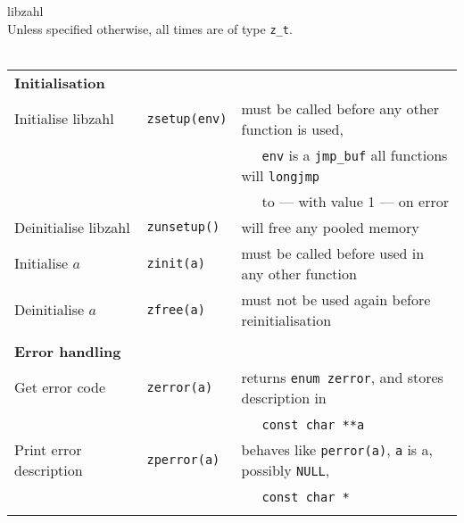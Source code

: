 \documentclass[10pt,draft]{article}
\begin{document}
{\Huge libzahl}
\\

Unless specified otherwise, all times are of type {\tt z\_t}.
\\ \\


\begin{tabular}{lll}
\textbf{Initialisation}       & {}                         & {}                                                \\
Initialise libzahl            & {\tt zsetup(env)}          & must be called before any other function is used, \\
{}                            & {}                         & $~~~~~$ {\tt env} is a {\tt jmp\_buf} all
                                                                     functions will {\tt longjmp}              \\
{}                            & {}                         & $~~~~~$ to --- with value 1 --- on error          \\
Deinitialise libzahl          & {\tt zunsetup()}           & will free any pooled memory                       \\
Initialise $a$                & {\tt zinit(a)}             & must be called before used in any other function  \\
Deinitialise $a$              & {\tt zfree(a)}             & must not be used again before reinitialisation    \\
\\

\textbf{Error handling}       & {}                         & {}                                                \\
Get error code                & {\tt zerror(a)}            & returns {\tt enum zerror},
                                                                     and stores description in                 \\
{}                            & {}                         & $~~~~~$ {\tt const char **a}                      \\
Print error description       & {\tt zperror(a)}           & behaves like {\tt perror(a)}, {\tt a} is a,
                                                                     possibly {\tt NULL},                      \\
{}                            & {}                         & $~~~~~$ {\tt const char *}                        \\
\\


\end{tabular}
\end{document}
